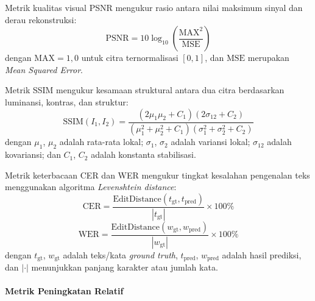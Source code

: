 \documentclass[12pt,a4paper]{article}
\begin{document}
Metrik kualitas visual PSNR mengukur rasio antara nilai maksimum sinyal dan derau rekonstruksi:
\begin{equation}
  \text{PSNR} = 10 \log_{10}\left(\frac{\text{MAX}^2}{\text{MSE}}\right)
  \label{eq:IV.17}
\end{equation}
dengan $\text{MAX}=1,0$ untuk citra ternormalisasi $[0,1]$, dan $\text{MSE}$ merupakan \textit{Mean Squared Error}.

Metrik SSIM mengukur kesamaan struktural antara dua citra berdasarkan luminansi, kontras, dan struktur:
\begin{equation}
  \text{SSIM}(I_1, I_2) = \frac{(2\mu_1\mu_2 + C_1)(2\sigma_{12} + C_2)}{(\mu_1^2 + \mu_2^2 + C_1)(\sigma_1^2 + \sigma_2^2 + C_2)}
  \label{eq:IV.18}
\end{equation}
dengan $\mu_1$, $\mu_2$ adalah rata-rata lokal; $\sigma_1$, $\sigma_2$ adalah variansi lokal; $\sigma_{12}$ adalah kovariansi; dan $C_1$, $C_2$ adalah konstanta stabilisasi.

Metrik keterbacaan CER dan WER mengukur tingkat kesalahan pengenalan teks menggunakan algoritma \textit{Levenshtein distance}:
\begin{equation}
  \text{CER} = \frac{\text{EditDistance}(t_{\text{gt}}, t_{\text{pred}})}{|t_{\text{gt}}|} \times 100\%
  \label{eq:IV.19}
\end{equation}
\begin{equation}
  \text{WER} = \frac{\text{EditDistance}(w_{\text{gt}}, w_{\text{pred}})}{|w_{\text{gt}}|} \times 100\%
  \label{eq:IV.20}
\end{equation}
dengan $t_{\text{gt}}$, $w_{\text{gt}}$ adalah teks/kata \textit{ground truth}, $t_{\text{pred}}$, $w_{\text{pred}}$ adalah hasil prediksi, dan $|\cdot|$ menunjukkan panjang karakter atau jumlah kata.

\paragraph{Metrik Peningkatan Relatif}
\end{document}

